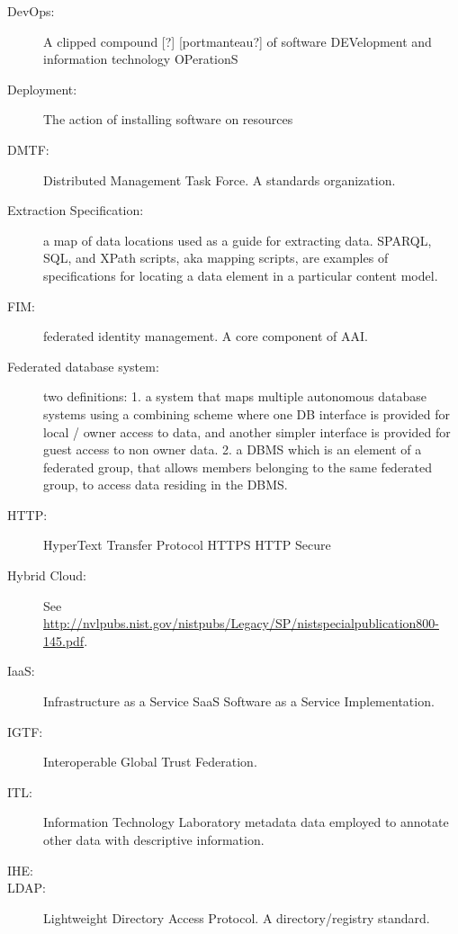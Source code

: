 \begin{description}
\item[DevOps:] A clipped compound [?] [portmanteau?] of software
  DEVelopment and information technology OPerationS 

\item[Deployment:] The action of installing software on resources

\item[DMTF:] Distributed Management Task Force. A standards
  organization.

\item[Extraction Specification:] a map of data locations used as a
  guide for extracting data. SPARQL, SQL, and XPath scripts, aka
  mapping scripts, are examples of specifications for locating a data
  element in a particular content model.

\item[FIM:] federated identity management. A core component of AAI.


\item[Federated database system:] two definitions: 1. a system that
  maps multiple autonomous database systems using a combining scheme
  where one DB interface is provided for local / owner access to data,
  and another simpler interface is provided for guest access to non
  owner data. 2. a DBMS which is an element of a federated group, that
    allows members belonging to the same federated group, to access
    data residing in the DBMS.

\item[HTTP:] HyperText Transfer Protocol HTTPS HTTP Secure

\item[Hybrid Cloud:] See
  \url{http://nvlpubs.nist.gov/nistpubs/Legacy/SP/nistspecialpublication800-145.pdf}.


\item[IaaS:] Infrastructure as a Service SaaS Software as a Service
  Implementation.

\item[IGTF:] Interoperable Global Trust Federation.

\item[ITL:] Information Technology Laboratory metadata data employed
  to annotate other data with descriptive information.

\item[IHE:] 

\item[LDAP:] Lightweight Directory Access Protocol. A
  directory/registry standard.


\end{description}
